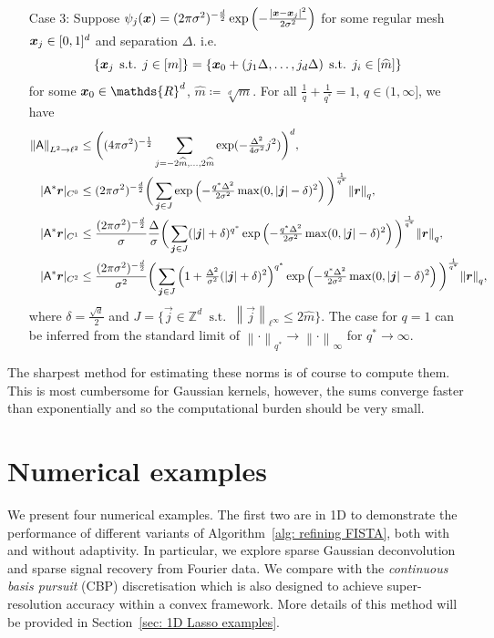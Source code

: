 \documentclass[smallextended]{svjour3}
\let\F\mathds\let\C\mathcal\newcommand{\R}{\F{R}}\newcommand{\A}{\tens{A}}
\newcommand{\norm}[1]{{\left\lVert #1 \right\rVert}}
\newcommand{\1}{\F{1}}
\DeclareMathOperator{\st}{\;s.t.\;}
\renewcommand{\hat}{\widehat}\renewcommand{\tilde}{\widetilde}
\newcommand*{\vard}[1]{%
	\IfEqCase{#1}{%
		{0}{\varphi}%
		{1}{\psi}%
	}[\varphi #1]%
}
\newcommand*{\varx}[1]{%
	\IfEqCase{#1}{%
		{0}{x}%
		{1}{y}%
		{2}{z}%
		{3}{r}%
	}[x#1]%
}
\newcommand*{\vvarx}[1]{\vec{\varx{#1}}}
\newcommand{\edit}[2]{{\ifmmode\text{\color{red}\sout{\ensuremath{#1}}}\else {\color{red} \sout{#1}}\fi} {\color{darkgreen} #2}}
\begin{document}
\begin{theorem}
{\begin{enumerate}
				\item[Case 3:] Suppose $\vard1_j(\vvarx0) = (2\pi\sigma^2)^{-\frac{d}{2}}\exp\left(-\frac{|\vvarx0-\vvarx0_j|^2}{2\sigma^2}\right)$ for some regular mesh $\vvarx0_j\in[0,1]^d$ and separation $\Delta$. i.e. 
				$$\{\vvarx0_j\st j\in[m]\} = \{\vvarx0_0 + (j_1\Delta,\ldots,j_d\Delta)\st j_i\in[\hat m]\}$$
				for some $\vvarx0_0\in\R^d$, $\hat m\coloneqq\sqrt[d]{m}$. For all $\frac1q + \frac{1}{q^*} = 1$, $q\in(1,\infty]$, we have
				\begin{align}
					\norm{\A}_{L^2\to\ell^2} &\leq \bigg((4\pi\sigma^2)^{-\frac 12}\sum_{j=-2\hat m,\ldots,2\hat m}\exp(-\tfrac{\Delta^2}{4\sigma^2}j^2)\bigg)^d,
					\\ |\A^*\vvarx3|_{C^0} &\leq (2\pi\sigma^2)^{-\frac{d}{2}}\bigg(\sum_{\vec j\in J}\exp\left(-\tfrac{q^*\Delta^2}{2\sigma^2}\max(0,|\vec j|-\delta)^2\right)\bigg)^{\frac1{q^*}}\norm{\vvarx3}_q,
					\\ |\A^*\vvarx3|_{C^1} &\leq \frac{(2\pi\sigma^2)^{-\frac{d}{2}}}{\sigma}\frac{\Delta}{\sigma}\bigg(\sum_{\vec j\in J}(|\vec j|+\delta)^{q^*}\exp\left(-\tfrac{q^*\Delta^2}{2\sigma^2}\max(0,|\vec j|-\delta)^2\right)\bigg)^{\frac1{q^*}}\norm{\vvarx3}_q,
					\\ |\A^*\vvarx3|_{C^2} &\leq \frac{(2\pi\sigma^2)^{-\frac{d}{2}}}{\sigma^2} \bigg(\sum_{\vec j\in J} \left(1+\tfrac{\Delta^2}{\sigma^2}(|\vec j|+\delta)^2\right)^{q^*}\exp\left(-\tfrac{q^*\Delta^2}{2\sigma^2}\max(0,|\vec j|-\delta)^2\right)\bigg)^{\frac1{q^*}} \norm{\vvarx3}_q,
				\end{align}
				where $\delta= \frac{\sqrt d}{2}$ and $J=\{\vec j\in\F Z^d \st \norm{\vec j}_{\ell^\infty}\leq 2\hat m\}$. The case for $q=1$ can be inferred from the standard limit of $\norm\cdot_{{q^*}}\to \norm\cdot_{\infty}$ for $q^*\to\infty$.
			\end{enumerate}
		}
	\end{theorem}
	
	The sharpest method for estimating these norms is of course to compute them. This is most cumbersome for Gaussian kernels, however, the sums converge faster than exponentially and so the computational burden should be very small.
	
	
	\section{Numerical examples}\label{sec: numerics}
	We present four numerical \edit{Lasso }{}examples. The first two are in 1D to demonstrate the performance of different variants of Algorithm~\ref{alg: refining FISTA}, both with and without adaptivity. In particular, we explore sparse Gaussian deconvolution and sparse signal recovery from Fourier data. We compare with the \emph{continuous basis pursuit} (CBP) discretisation \cite{Ekanadham2011,Duval2017b} which is also designed to achieve super-resolution accuracy within a convex framework. More details of this method will be provided in Section~\ref{sec: 1D Lasso examples}.
	
\end{document}
